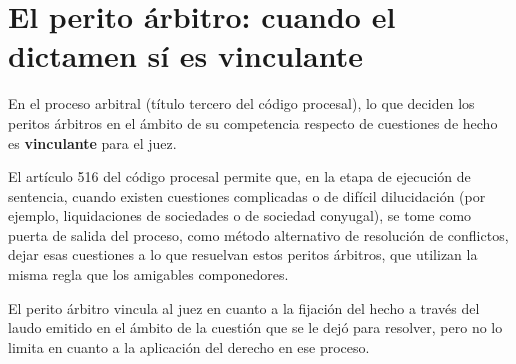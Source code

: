 \documentclass[12pt,oneside]{book}
\begin{document}
\section{El perito árbitro: cuando el dictamen sí es vinculante}

En el proceso arbitral (título tercero del código procesal), lo que deciden los peritos árbitros en el ámbito de su competencia respecto de cuestiones de hecho es \textbf{vinculante} para el juez.

El artículo 516 del código procesal permite que, en la etapa de ejecución de sentencia, cuando existen cuestiones complicadas o de difícil dilucidación (por ejemplo, liquidaciones de sociedades o de sociedad conyugal), se tome como puerta de salida del proceso, como método alternativo de resolución de conflictos, dejar esas cuestiones a lo que resuelvan estos peritos árbitros, que utilizan la misma regla que los amigables componedores.

El perito árbitro vincula al juez en cuanto a la fijación del hecho a través del laudo emitido en el ámbito de la cuestión que se le dejó para resolver, pero no lo limita en cuanto a la aplicación del derecho en ese proceso.
\end{document}
